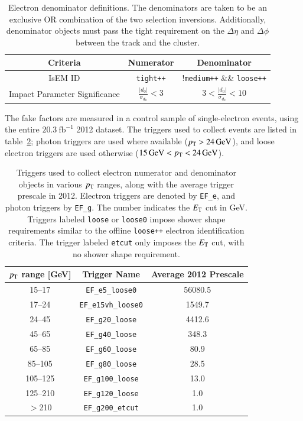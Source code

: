 \begin{table}[h]
  \centering
  \begin{tabular}{ccc}
	\hline
	Criteria & Numerator & Denominator \\ \hline
	IsEM ID & \texttt{tight++} & !\texttt{medium++} \&\& \texttt{loose++}  \\
	Impact Parameter Significance & $\frac{|d_0|}{\sigma_{d_0}} < 3$ & $3 < \frac{|d_0|}{\sigma_{d_0}} < 10$ \\
	\hline
  \end{tabular}
  \caption{Electron denominator definitions. The denominators are taken to be an exclusive OR combination of the two selection inversions. Additionally, denominator objects must pass the tight requirement on the $\Delta\eta$ and $\Delta\phi$ between the track and the cluster.}
  \label{table:electron-denominator-definition}
\end{table}

The fake factors are measured in a control sample of single-electron events, using the entire $\SI{20.3}{\femto\barn\tothe{-1}}$ 2012 dataset. The triggers used to collect events are listed in table~\ref{table:electron-fake-factor-triggers}; photon triggers are used where available ($p_{\text{T}}>\SI{24}{\giga\electronvolt}$), and loose electron triggers are used otherwise ($\SI{15}{\giga\electronvolt}<p_{\text{T}}<\SI{24}{\giga\electronvolt}$). 

\begin{table}[h]
  \centering
  \begin{tabular}{ccc}
  \hline
	$p_{\text{T}}$ range [GeV] & Trigger Name & Average 2012 Prescale \\
	\hline
	15--17 & 	\texttt{EF\_e5\_loose0}	& 56080.5\\
	17--24 & 	\texttt{EF\_e15vh\_loose0} 	& 1549.7\\
	24--45 & 	\texttt{EF\_g20\_loose}	& 4412.6\\
	45--65 & 	\texttt{EF\_g40\_loose}	& 348.3\\
	65--85 & 	\texttt{EF\_g60\_loose}	& 80.9\\
	85--105 & 	\texttt{EF\_g80\_loose}	& 28.5\\
	105--125 & 	\texttt{EF\_g100\_loose}	& 13.0\\
	125--210 & 	\texttt{EF\_g120\_loose}	& 1.0\\
	$>$210 & 	\texttt{EF\_g200\_etcut}	& 1.0\\ \hline
  \end{tabular}
  \caption{Triggers used to collect electron numerator and denominator objects in various $p_{\text{T}}$ ranges, along with the average trigger prescale in 2012. Electron triggers are denoted by \texttt{EF\_e}, and photon triggers by \texttt{EF\_g}. The number indicates the $E_{\mathrm{T}}$ cut in GeV. Triggers labeled \texttt{loose} or \texttt{loose0} impose shower shape requirements similar to the offline \texttt{loose++} electron identification criteria. The trigger labeled \texttt{etcut} only imposes the $E_{\mathrm{T}}$ cut, with no shower shape requirement.}
  \label{table:electron-fake-factor-triggers}
\end{table}

